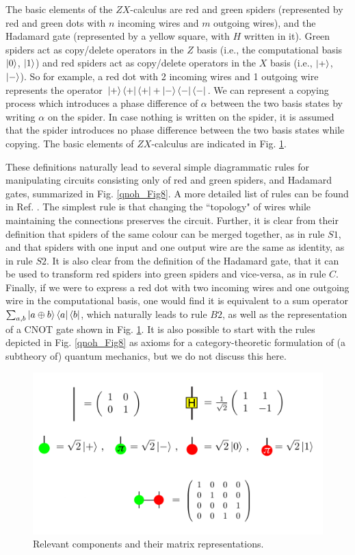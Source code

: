 The basic elements of the $ZX$-calculus are red and green spiders (represented by red and green dots with $n$ incoming wires and $m$ outgoing wires), and the Hadamard gate (represented by a yellow square, with $H$ written in it). Green spiders act as copy/delete operators in the $Z$ basis (i.e., the computational basis $\ket{0}$, $\ket{1}$) and red spiders act as copy/delete operators in the $X$ basis (i.e., $\ket{+}$, $\ket{-}$).  So for example, a red dot with 2 incoming wires and 1 outgoing wire represents the operator $\ket{+}\bra{+}\bra{+}+\ket{-}\bra{-}\bra{-}$. We can represent a copying process which introduces a phase difference of $\alpha$ between the two basis states by writing $\alpha$ on the spider. In case nothing is written on the spider, it is assumed that the spider introduces no phase difference between the two basis states while copying. The basic elements of $ZX$-calculus are indicated in Fig. \ref{qnoh_Fig7}.

These definitions naturally lead to several simple diagrammatic rules for manipulating circuits consisting only of red and green spiders, and Hadamard gates, summarized in Fig. \ref{qnoh_Fig8}. A more detailed list of rules can be found in Ref. \cite{qnoh_Bob1}. The simplest rule is that changing the ``topology" of wires while maintaining the connections preserves the circuit. Further, it is clear from their definition that spiders of the same colour can be merged together, as in rule $S1$, and that spiders with one input and one output wire are the same as identity, as in rule $S2$. It is also clear from the definition of the Hadamard gate, that it can be used to transform red spiders into green spiders and vice-versa, as in rule $C$. Finally, if we were to express a red dot with two incoming wires and one outgoing wire in the computational basis, one would find it is equivalent to a sum operator $\sum_{a,b}\ket{a\oplus b}\bra{a}\bra{b}$, which naturally leads to rule $B2$, as well as the representation of a CNOT gate shown in Fig. \ref{qnoh_Fig7}. It is also possible to start with the rules depicted in Fig. \ref{qnoh_Fig8} as axioms for a category-theoretic formulation of (a subtheory of) quantum mechanics, but we do not discuss this here.

\begin{figure}
\centering
\includegraphics[width=0.8\linewidth]{qnoh_Fig7}
\caption{Relevant components and their matrix representations.}
\label{qnoh_Fig7}
\end{figure}


